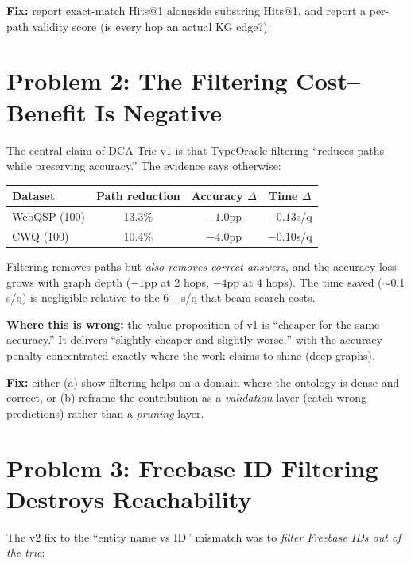 \documentclass[11pt,a4paper]{article}
\begin{document}
\textbf{Fix:} report exact-match Hits@1 alongside substring Hits@1, and
report a per-path validity score (is every hop an actual KG edge?).

\section{Problem 2: The Filtering Cost--Benefit Is Negative}

The central claim of DCA-Trie v1 is that TypeOracle filtering
``reduces paths while preserving accuracy.''  The evidence says
otherwise:

\begin{center}
\begin{tabular}{@{}lccc@{}}
\toprule
  Dataset & Path reduction & Accuracy $\Delta$ & Time $\Delta$ \\
\midrule
  WebQSP (100) & 13.3\% & $-1.0$pp & $-0.13$s/q \\
  CWQ (100)    & 10.4\% & $-4.0$pp & $-0.10$s/q \\
\bottomrule
\end{tabular}
\end{center}

Filtering removes paths but \emph{also removes correct answers}, and the
accuracy loss grows with graph depth ($-1$pp at 2 hops, $-4$pp at 4
hops).  The time saved ($\sim$0.1 s/q) is negligible relative to the
6+ s/q that beam search costs.

\textbf{Where this is wrong:} the value proposition of v1 is
``cheaper for the same accuracy.''  It delivers ``slightly cheaper and
slightly worse,'' with the accuracy penalty concentrated exactly where
the work claims to shine (deep graphs).

\textbf{Fix:} either (a) show filtering helps on a domain where the
ontology is dense and correct, or (b) reframe the contribution as a
\emph{validation} layer (catch wrong predictions) rather than a
\emph{pruning} layer.

\section{Problem 3: Freebase ID Filtering Destroys Reachability}

The v2 fix to the ``entity name vs ID'' mismatch was to \emph{filter
Freebase IDs out of the trie}:
\end{document}
